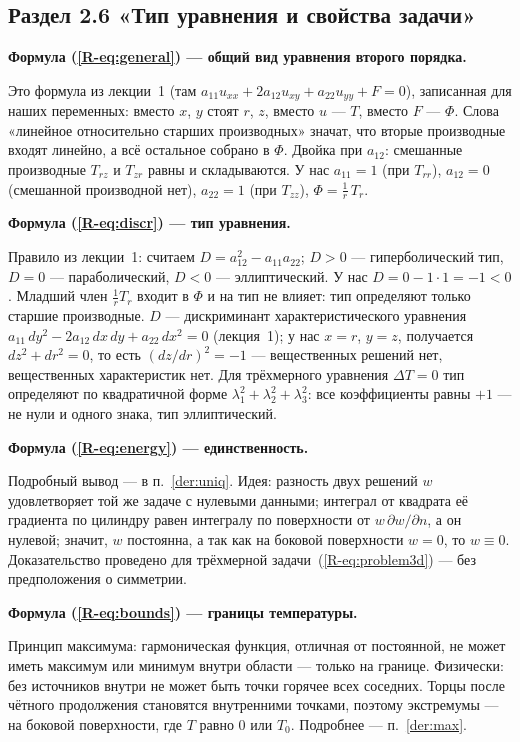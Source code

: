 \documentclass[a4paper,12pt]{article}
\newcommand{\rf}[1]{(\ref*{R-#1})}
\newcommand{\fhead}[2]{\par\medskip\textbf{Формула #1 — #2.}\par\nopagebreak[4]}
\begin{document}
\subsection{Раздел 2.6 «Тип уравнения и свойства задачи»}

\fhead{\rf{eq:general}}{общий вид уравнения второго порядка}
Это формула из лекции~1 (там $a_{11}u_{xx}+2a_{12}u_{xy}+a_{22}u_{yy}+F=0$),
записанная для наших переменных: вместо $x$, $y$ стоят $r$, $z$, вместо
$u$ — $T$, вместо $F$ — $\Phi$. Слова «линейное относительно старших
производных» значат, что вторые производные входят линейно, а всё остальное
собрано в $\Phi$. Двойка при $a_{12}$: смешанные производные $T_{rz}$
и $T_{zr}$ равны и складываются. У нас $a_{11}=1$ (при $T_{rr}$), $a_{12}=0$
(смешанной производной нет), $a_{22}=1$ (при $T_{zz}$),
$\Phi=\frac1r\,T_r$.

\fhead{\rf{eq:discr}}{тип уравнения}
Правило из лекции~1: считаем $D=a_{12}^2-a_{11}a_{22}$; $D>0$ —
гиперболический тип, $D=0$ — параболический, $D<0$ — эллиптический. У нас
$D=0-1\cdot1=-1<0$. Младший член $\frac1r T_r$ входит в $\Phi$ и на тип не
влияет: тип определяют только старшие производные. $D$ — дискриминант
характеристического уравнения $a_{11}\,dy^2-2a_{12}\,dx\,dy+a_{22}\,dx^2=0$
(лекция~1); у нас $x=r$, $y=z$, получается $dz^2+dr^2=0$, то есть
$(dz/dr)^2=-1$ — вещественных решений нет, вещественных характеристик нет.
Для трёхмерного уравнения $\Delta T=0$ тип определяют по квадратичной форме
$\lambda_1^2+\lambda_2^2+\lambda_3^2$: все коэффициенты равны $+1$ — не
нули и одного знака, тип эллиптический.

\fhead{\rf{eq:energy}}{единственность}
Подробный вывод — в п.~\ref{der:uniq}. Идея: разность двух решений $w$
удовлетворяет той же задаче с нулевыми данными; интеграл от квадрата её
градиента по цилиндру равен интегралу по поверхности от
$w\,\partial w/\partial n$, а он нулевой; значит, $w$ постоянна, а так как
на боковой поверхности $w=0$, то $w\equiv0$. Доказательство проведено для
трёхмерной задачи~\rf{eq:problem3d} — без предположения о симметрии.

\fhead{\rf{eq:bounds}}{границы температуры}
Принцип максимума: гармоническая функция, отличная от постоянной, не может
иметь максимум или минимум внутри области — только на границе. Физически:
без источников внутри не может быть точки горячее всех соседних. Торцы
после чётного продолжения становятся внутренними точками, поэтому экстремумы
— на боковой поверхности, где $T$ равно 0 или $T_0$. Подробнее —
п.~\ref{der:max}.
\end{document}
